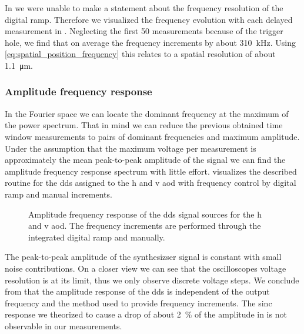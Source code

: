 In  we were unable to make a statement about
the frequency resolution of the digital ramp. Therefore we visualized the
frequency evolution with each delayed measurement in
. Neglecting the first \num{50}
measurements because of the trigger hole, we find that on average the
frequency increments by about \SI{310}{\kilo\hertz}. Using
\cref{eq:spatial_position_frequency} this relates to a spatial resolution of
about \SI{1.1}{\micro\meter}.

\subsubsection{Amplitude frequency response}

In the Fourier space we can locate the dominant frequency at the maximum of
the power spectrum. That in mind we can reduce the previous obtained time
window measurements to pairs of dominant frequencies and maximum amplitude.
Under the assumption that the maximum voltage per measurement is approximately
the mean peak-to-peak amplitude of the signal we can find the amplitude
frequency response spectrum with little effort.
 visualizes the described routine for the
\gls{dds} assigned to the \gls{h} and \gls{v} \gls{aod} with frequency control
by digital ramp and manual increments.
\begin{figure}[htb]
  \centering
  \begin{adjustbox}{width=\textwidth}
    
  \end{adjustbox}
  \caption{Amplitude frequency response of the \gls{dds} signal sources for
    the \gls{h} and \gls{v} \gls{aod}. The frequency increments
    are performed through the integrated digital ramp and manually.
  }\label{fig:signal_synthesis_response}
\end{figure}
The peak-to-peak amplitude of the synthesizser signal is constant with small
noise contributions. On a closer view we can see that the oscilloscopes
voltage resolution is at its limit, thus we only observe discrete voltage
steps. We conclude from  that the
amplitude response of the \gls{dds} is independent of the output frequency
and the method used to provide frequency increments. The sinc response
we theorized to cause a drop of about \SI{2}{\percent} of the amplitude in
 is not observable in our measurements.

